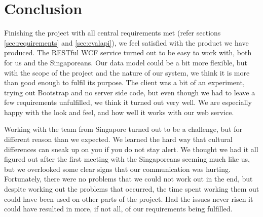 \section{Conclusion}
Finishing the project with all central requirements met (refer sections
\ref{sec:requirements} and \ref{sec:evalapi}), we feel satisfied with the product
we have produced. 
The RESTful WCF service turned out to be easy to work with,
both for us and the Singaporeans. Our data model could be a bit more flexible, but
with the scope of the project and the nature of our system, we think it is more than good
enough to fulfil its purpose.
The client was a bit of an experiment, trying out Bootstrap and no server side code,
but even though we had to leave a few requirements unfulfilled, we think it 
turned out very well. We are especially happy with the look and feel, and how well it works with our web service.

Working with the team from Singapore turned out to be a challenge, but for 
different reason than we expected. We learned the hard way that 
cultural differences can sneak up on you if you do not stay alert. We
thought we had it all figured out after the first meeting with the Singaporeans
seeming much like us, but we overlooked some clear signs that our communication
was hurting.
Fortunately, there were no problems that we could not work out in the end, but
despite working out the problems that occurred, the time spent working them out
could have been used on other parts of the project. 
Had the issues never risen it could have resulted in more, if not all, of our requirements being fulfilled.

